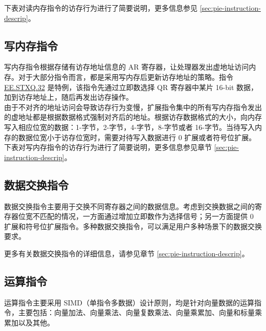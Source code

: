 \documentclass[main\_\_CN.tex]{subfiles}
\begin{document}
下表对读内存指令的访存行为进行了简要说明，更多信息参见 \ref{sec:pie-instruction-descrip}。

\clearpage



\subsection{写内存指令}

\label{sec:pie-write-instrucitons}

写内存指令根据存储有访存地址信息的 AR 寄存器，让处理器发出虚地址访问内存。对于大部分指令而言，都是采用写内存后更新访存地址的策略。指令 \hyperref[instruction:EESTXQ32]{EE.STXQ.32} 是特例，该指令先通过立即数选择 QR 寄存器中某片 16-bit 数据，加到访存地址上，随后再发出访存操作。\\
由于不对齐的地址访问会导致访存行为变慢，扩展指令集中的所有写内存指令发出的虚地址都是根据数据格式强制对齐后的地址。根据访存数据格式的大小，向内存写入相应位宽的数据：1-字节，2-字节，4-字节，8-字节或者 16-字节。当待写入内存的数据位宽小于访存位宽时，需要对待写入数据进行 0 扩展或者符号位扩展。\\
下表对写内存指令的访存行为进行了简要说明，更多信息参见章节 \ref{sec:pie-instruction-descrip}。



\subsection{数据交换指令}\label{sec:pie_data_exchange_instrucitons}

数据交换指令主要用于交换不同寄存器之间的数据信息。考虑到交换数据之间的寄存器位宽不匹配的情况，一方面通过增加立即数作为选择信号；另一方面提供 0 扩展和符号位扩展指令。多种数据交换指令，可以满足用户多种场景下的数据交换要求。

更多有关数据交换指令的详细信息，请参见章节 \ref{sec:pie-instruction-descrip}。




\subsection{运算指令}
\label{sec:pie-arithmetic-instrucitons}

运算指令主要采用 SIMD（单指令多数据）设计原则，均是针对向量数据的运算指令，主要包括：向量加法、向量乘法、向量复数乘法、向量乘累加、向量和标量乘累加以及其他。
\end{document}
